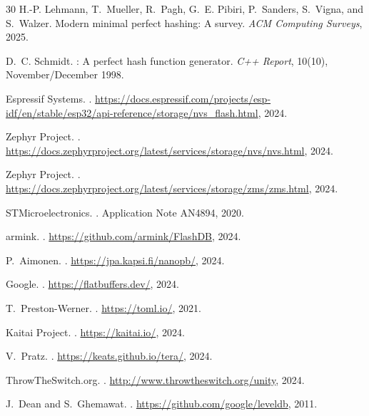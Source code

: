 \documentclass[10pt,twocolumn,letterpaper]{article}
\begin{document}
\begin{thebibliography}{30}
H.-P. Lehmann, T.~Mueller, R.~Pagh, G.~E. Pibiri, P.~Sanders, S.~Vigna,
  and S.~Walzer.
\newblock Modern minimal perfect hashing: A survey.
\newblock \emph{ACM Computing Surveys}, 2025.

D.~C. Schmidt.
: A perfect hash function generator.
\newblock \emph{C++ Report}, 10(10), November/December 1998.

{Espressif Systems}.
.
\newblock \url{https://docs.espressif.com/projects/esp-idf/en/stable/esp32/api-reference/storage/nvs_flash.html}, 2024.

{Zephyr Project}.
.
\newblock \url{https://docs.zephyrproject.org/latest/services/storage/nvs/nvs.html}, 2024.

{Zephyr Project}.
.
\newblock \url{https://docs.zephyrproject.org/latest/services/storage/zms/zms.html}, 2024.

{STMicroelectronics}.
.
\newblock Application Note AN4894, 2020.

{armink}.
.
\newblock \url{https://github.com/armink/FlashDB}, 2024.

P.~Aimonen.
.
\newblock \url{https://jpa.kapsi.fi/nanopb/}, 2024.

{Google}.
.
\newblock \url{https://flatbuffers.dev/}, 2024.

T.~Preston-Werner.
.
\newblock \url{https://toml.io/}, 2021.

{Kaitai Project}.
.
\newblock \url{https://kaitai.io/}, 2024.

V.~Pratz.
.
\newblock \url{https://keats.github.io/tera/}, 2024.

{ThrowTheSwitch.org}.
.
\newblock \url{http://www.throwtheswitch.org/unity}, 2024.

J.~Dean and S.~Ghemawat.
.
\newblock \url{https://github.com/google/leveldb}, 2011.


\end{thebibliography}
\end{document}

